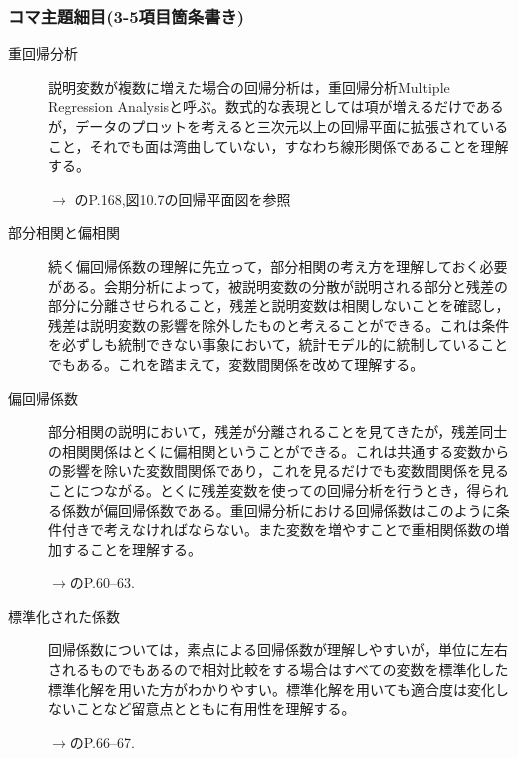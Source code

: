 \subsubsection{コマ主題細目(3-5項目箇条書き)}
\begin{description}


	\item[重回帰分析]説明変数が複数に増えた場合の回帰分析は，重回帰分析Multiple Regression Analysisと呼ぶ。数式的な表現としては項が増えるだけであるが，データのプロットを考えると三次元以上の回帰平面に拡張されていること，それでも面は湾曲していない，すなわち線形関係であることを理解する。
	      \begin{flushright}
		      $\to$ \textcite{kosugi2019}のP.168,図10.7の回帰平面図を参照
	      \end{flushright}

	\item[部分相関と偏相関] 続く偏回帰係数の理解に先立って，部分相関の考え方を理解しておく必要がある。会期分析によって，被説明変数の分散が説明される部分と残差の部分に分離させられること，残差と説明変数は相関しないことを確認し，残差は説明変数の影響を除外したものと考えることができる。これは条件を必ずしも統制できない事象において，統計モデル的に統制していることでもある。これを踏まえて，変数間関係を改めて理解する。


	\item[偏回帰係数]部分相関の説明において，残差が分離されることを見てきたが，残差同士の相関関係はとくに偏相関ということができる。これは共通する変数からの影響を除いた変数間関係であり，これを見るだけでも変数間関係を見ることにつながる。とくに残差変数を使っての回帰分析を行うとき，得られる係数が偏回帰係数である。重回帰分析における回帰係数はこのように条件付きで考えなければならない。また変数を増やすことで重相関係数の増加することを理解する。
	      \begin{flushright}
		      $\to$\textcite{kosugi2018}のP.60--63.
	      \end{flushright}

	\item[標準化された係数]回帰係数については，素点による回帰係数が理解しやすいが，単位に左右されるものでもあるので相対比較をする場合はすべての変数を標準化した標準化解を用いた方がわかりやすい。標準化解を用いても適合度は変化しないことなど留意点とともに有用性を理解する。
	      \begin{flushright}
		      $\to$\textcite{kosugi2018}のP.66--67.
	      \end{flushright}




\end{description}
